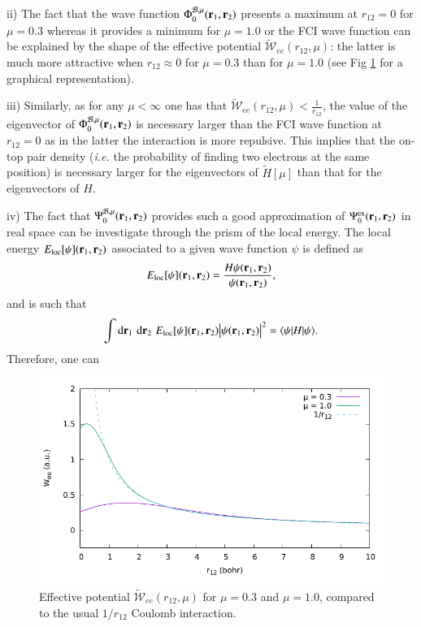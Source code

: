 \documentclass[aip,jcp,reprint,noshowkeys,superscriptaddress]{revtex4-1}
\newcommand{\matelem}[3]{\langle #1 | #2 | #3 \rangle}
\newcommand{\br}[0]{{\bf {r}}}
\newcommand{\psiex}[0]{\Psi^{\text{ex}}_0}
\newcommand{\phimub}[0]{\Phi^{\mathcal{B},\mu}_0}
\newcommand{\psimub}[0]{\Psi^{\mathcal{B},\mu}_0}
\begin{document}
ii) The fact that the wave function $\phimub(\br{}_1,\br{}_2)$ presents a maximum at $r_{12}=0$ for $\mu=0.3$ whereas it provides a minimum for $\mu=1.0$ or the FCI wave function can be explained by the shape of the effective potential $\tilde{\mathcal{W}}_{ee}(r_{12},\mu)$: the latter is much more attractive when $r_{12}\approx 0$ for $\mu=0.3$ than for $\mu = 1.0$ (see Fig \ref{fig_wee_compare} for a graphical representation). 

iii) Similarly, as for any $\mu < \infty$ one has that $\tilde{\mathcal{W}}_{ee}(r_{12},\mu) <\frac{1}{r_{12}}$, the value of the eigenvector of $\phimub(\br{}_1,\br{}_2)$ is necessary larger than the FCI wave function at $r_{12}=0$ as in the latter the interaction is more repulsive. This implies that the on-top pair density (\textit{i.e.} the probability of finding two electrons at the same position) is necessary larger for the eigenvectors of $\tilde{H}[\mu]$ than that for the eigenvectors of $H$.

iv) The fact that $\psimub(\br{}_1,\br{}_2)$ provides  such a good approximation of $\psiex(\br{}_1,\br{}_2)$ in real space can be investigate through the prism of the local energy. 
The local energy $E_{\text{loc}}[\psi](\br{}_1,\br{}_2)$ associated to a given wave function $\psi$ is defined as 
\begin{equation}
 E_{\text{loc}}[\psi](\br{}_1,\br{}_2) = \frac{H\psi(\br{}_1,\br{}_2)}{\psi(\br{}_1,\br{}_2)},
\end{equation}
and is such that 
\begin{equation}
 \int \text{d}\br{}_1\,\,\text{d}\br{}_2\,\, E_{\text{loc}}[\psi](\br{}_1,\br{}_2) \big|\psi(\br{}_1,\br{}_2)\big|^2= \matelem{\psi}{H}{\psi}.
\end{equation}
Therefore, one can 
\begin{figure}
 \label{fig_wee_compare}
        \includegraphics[width=1.00\linewidth]{w_ee_compare.pdf}
        \caption{
        Effective potential $\tilde{\mathcal{W}}_{ee}(r_{12},\mu)$ for $\mu=0.3$ and $\mu=1.0$, compared to the usual $1/r_{12}$ Coulomb interaction.}
\end{figure}
\end{document}
